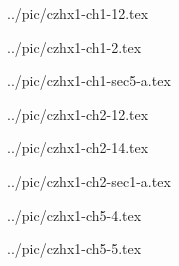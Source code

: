 

../pic/czhx1-ch1-12.tex



../pic/czhx1-ch1-2.tex



../pic/czhx1-ch1-sec5-a.tex



../pic/czhx1-ch2-12.tex



../pic/czhx1-ch2-14.tex



../pic/czhx1-ch2-sec1-a.tex



../pic/czhx1-ch5-4.tex



../pic/czhx1-ch5-5.tex

